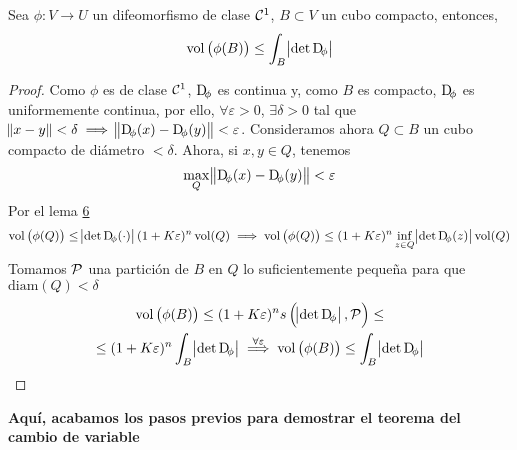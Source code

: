 \begin{lema*}[7]\label{lema:siete_cambio}
    Sea $\phi \colon V \to U$ un difeomorfismo de clase $\mathcal{C}^1$, $B \subset V$ un cubo compacto, entonces,
    \[
        \vol\left( \phi(B) \right) \leq \int_B \abs{\det \Dif_\phi}
    \]
\end{lema*}

\begin{proof}
    Como $\phi$ es de clase $\mathcal{C}^1$, $\Dif_\phi$ es continua y, como $B$ es compacto, $\Dif_\phi$ es uniformemente continua, por ello,
    $\forall \varepsilon > 0$, $\exists \delta > 0$ tal que $\norm{x - y} < \delta \implies \norm{\Dif_\phi(x) - \Dif_\phi(y)} < \varepsilon$.
    Consideramos ahora $Q \subset B$ un cubo compacto de diámetro $< \delta$. Ahora, si $x,y \in Q$, tenemos
    \[
        \max_{Q} \norm{\Dif_\phi(x) - \Dif_\phi(y)} < \varepsilon
    \]
    Por el lema \hyperref[lema:seis_cambio]{6}
    \[
        \vol\left( \phi(Q) \right) \leq \abs{\det \Dif_\phi(\cdot)} (1+K\varepsilon)^n \vol(Q) \implies
        \vol\left( \phi(Q) \right) \leq (1+K\varepsilon)^n\inf_{z \in Q} \abs{\det \Dif_\phi(z)} \vol(Q)
    \]
    Tomamos $\mathcal{P}$ una partición de $B$ en $Q$ lo suficientemente pequeña para que $\text{diam}(Q) < \delta$
    \begin{gather*}
        \vol\left( \phi(B) \right) \leq (1+K\varepsilon)^n s\left( \abs{\det \Dif_\phi}, \Pa \right) \leq \\ \leq  (1+K\varepsilon)^n \int_B \abs{\det \Dif_\phi}
        \stackrel{\forall \varepsilon}{\implies} \vol\left( \phi(B) \right) \leq \int_B \abs{\det \Dif_\phi}
    \end{gather*}
\end{proof}

\textbf{Aquí, acabamos los pasos previos para demostrar el teorema del cambio de variable}

